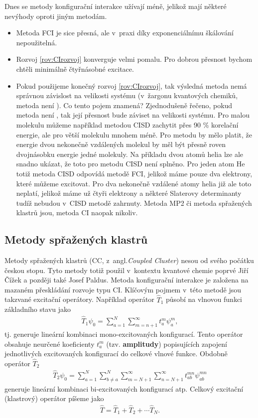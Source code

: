 Dnes se metody konfigurační interakce užívají méně, jelikož mají některé nevýhody oproti jiným metodám. 
\begin{itemize}
\item Metoda FCI je sice přesná, ale v~praxi díky exponenciálnímu škálování nepoužitelná.
\item Rozvoj \ref{rov:CIrozvoj} konverguje velmi pomalu. Pro dobrou přesnost bychom chtěli minimálně čtyřnásobné excitace.
\item Pokud použijeme konečný rozvoj \ref{rov:CIrozvoj}, tak výsledná metoda nemá správnou závislost na velikosti systému (v~žargonu kvantových chemiků, metoda není ). Co tento pojem znamená? Zjednodušeně řečeno, pokud metoda není , tak její přesnost bude záviset na velikosti systému. Pro malou molekulu můžeme například metodou CISD zachytit přes 90 \% korelační energie, ale pro větší molekulu mnohem méně. Pro  metodu by mělo platit, že energie dvou nekonečně vzdálených molekul by měl být přesně roven dvojnásobku energie jedné molekuly. Na příkladu dvou atomů helia lze ale snadno ukázat, že toto pro metodu CISD není splněno. Pro jeden atom He totiž metoda CISD odpovídá metodě FCI, jelikož máme pouze dva elektrony, které můžeme excitovat. Pro dva nekonečně vzdálené atomy helia již ale toto neplatí, jelikož máme už čtyři elektrony a některé Slaterovy determinanty tudíž nebudou v~CISD metodě zahrnuty. 
Metoda MP2 či metoda spřažených klastrů  jsou, metoda CI naopak nikoliv. 
\end{itemize}


\subsection{Metody spřažených klastrů}
Metody spřažených klastrů (CC, z~angl.\textit{Coupled Cluster}) nesou od svého počátku českou stopu. Tyto metody totiž použil v~kontextu kvantové chemie poprvé Jiří Čížek a později také Josef Paldus. Metoda konfigurační interakce je založena na mazaném přeskládání rozvoje typu CI. Klíčovým pojmem v~této metodě jsou takzvané excitační operátory. Například operátor $\hat{T}_1$ působí na vlnovou funkci základního stavu jako
\begin{eqnarray}
\hat{T}_1\psi_0=\sum^N_{a=1}\sum_{m=n+1}^\infty t_a^m\psi_a^m , 
\end{eqnarray}
tj. generuje lineární kombinaci mono-excitovaných konfigurací.  Tento operátor obsahuje neurčené koeficienty $t_a^m$ (tzv. \textbf{amplitudy}) popisujících zapojení jednotlivých excitovaných konfigurací do celkové vlnové funkce. Obdobně operátor $\hat{T}_2$ 
\begin{eqnarray}
\hat{T}_2\psi_0=\sum_{a=1}^N \sum_{b\neq a}^N\sum_{m=N+1}^\infty \sum_{n=N+1}^\infty t_{ab}^{mn}\psi_{ab}^{mn}
\end{eqnarray}
generuje lineární kombinaci  bi-excitovaných konfigurací atp. Celkový excitační (klastrový) operátor píšeme jako
\begin{eqnarray}
\hat{T}=\hat{T}_1+\hat{T}_2+\cdots \hat{T}_N.
\end{eqnarray}

